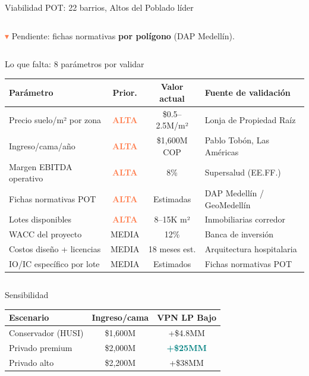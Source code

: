 \documentclass[aspectratio=169, 11pt]{beamer}
\newcommand{\highlight}[1]{\textcolor{teal}{\textbf{#1}}}
\newcommand{\danger}[1]{\textcolor{coral}{\textbf{#1}}}
\begin{document}
\begin{frame}{Viabilidad POT: 22 barrios, Altos del Poblado líder}
\begin{columns}[T]
\vspace{4pt}
{\footnotesize\textcolor{coral}{$\blacktriangledown$} Pendiente: fichas normativas \textbf{por polígono} (DAP Medellín).}
\end{columns}
\end{frame}

{
\begin{frame}{Lo que falta: 8 parámetros por validar}

\vspace{-2pt}
{\scriptsize
\begin{tabular}{@{}p{4.0cm}ccl@{}}
\toprule
\textbf{Parámetro} & \textbf{Prior.} & \textbf{Valor actual} & \textbf{Fuente de validación} \\
\midrule
\rowcolor{coral!8}
Precio suelo/m² por zona & \danger{ALTA} & \$0.5--2.5M/m² & Lonja de Propiedad Raíz \\
\rowcolor{coral!8}
Ingreso/cama/año & \danger{ALTA} & \$1,600M COP & Pablo Tobón, Las Américas \\
\rowcolor{coral!6}
Margen EBITDA operativo & \danger{ALTA} & 8\% & Supersalud (EE.FF.) \\
Fichas normativas POT & \danger{ALTA} & Estimadas & DAP Medellín / GeoMedellín \\
Lotes disponibles & \danger{ALTA} & 8--15K m² & Inmobiliarias corredor \\
\rowcolor{amber!10}
WACC del proyecto & MEDIA & 12\% & Banca de inversión \\
\rowcolor{amber!10}
Costos diseño + licencias & MEDIA & 18 meses est. & Arquitectura hospitalaria \\
IO/IC específico por lote & MEDIA & Estimados & Fichas normativas POT \\
\bottomrule
\end{tabular}
}

\vspace{4pt}
\begin{columns}[T]
\begin{alertblock}{\small Sensibilidad}
\scriptsize
{\scriptsize
\begin{tabular}{@{}lcc@{}}
\toprule
\textbf{Escenario} & \textbf{Ingreso/cama} & \textbf{VPN LP Bajo} \\
\midrule
\rowcolor{coral!6}
Conservador (HUSI) & \$1,600M & +\$4.8MM \\
\rowcolor{teal!6}
Privado premium & \$2,000M & \highlight{+\$25MM} \\
Privado alto & \$2,200M & +\$38MM \\
\bottomrule
\end{tabular}
}
\end{alertblock}


\end{columns}
\end{frame}}
\end{document}
